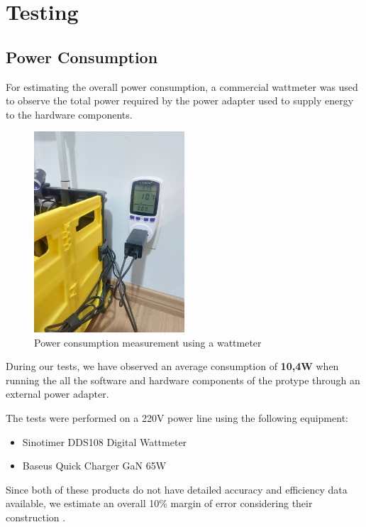 \documentclass[openright]{normas-utf-tex} %
\begin{document}
\section{Testing}

\subsection{Power Consumption}

For estimating the overall power consumption, a commercial wattmeter was used
to observe the total power required by the power adapter used to supply energy
to the hardware components.

\begin{figure}[H]
	\centering
	\includegraphics[width=0.5\textwidth]{./images/powerconsumption.jpeg}
	\caption[Power consumption measurement using a wattmeter]{Power consumption measurement using a wattmeter}
\end{figure}

During our tests, we have observed an average consumption of \textbf{10,4W}
when running the all the software and hardware components of the protype
through an external power adapter. 

The tests were performed on a 220V power line using the following equipment:
\begin{itemize}
    \item Sinotimer DDS108 Digital Wattmeter
    \item Baseus Quick Charger GaN 65W
\end{itemize}

Since both of these products do not have detailed accuracy and efficiency data
available, we estimate an overall 10\% margin of error considering their
construction \cite{Chen2017}. 
\end{document}
